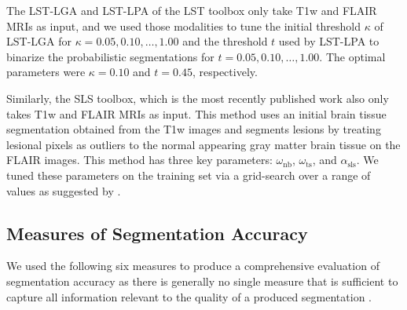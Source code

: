 The LST-LGA and LST-LPA of the LST toolbox only take T1w and FLAIR MRIs as
input, and we used those modalities to tune the initial threshold $\kappa$ of
LST-LGA for $\kappa = 0.05, 0.10, \dotsc, 1.00$ and the threshold $t$ used by
LST-LPA to binarize the probabilistic segmentations for $t = 0.05, 0.10, \dotsc,
1.00$. The optimal parameters were $\kappa = 0.10$ and $t = 0.45$, respectively.

Similarly, the SLS toolbox, which is the most recently published work
\citep{roura2015} also only takes T1w and FLAIR MRIs as input. This method uses
an initial brain tissue segmentation obtained from the T1w images and segments
lesions by treating lesional pixels as outliers to the normal appearing gray
matter brain tissue on the FLAIR images. This method has three key parameters:
$\omega_\text{nb}$, $\omega_\text{ts}$, and $\alpha_\text{sls}$. We tuned these
parameters on the training set via a grid-search over a range of values as
suggested by \citet{roura2015}.

\subsection[Measures of segmentation accuracy]{Measures of Segmentation
Accuracy}
 
We used the following six measures to produce a comprehensive evaluation
of segmentation accuracy as there is generally no single measure that is
sufficient to capture all information relevant to the quality of a produced
segmentation \citep{garcia2013}.

